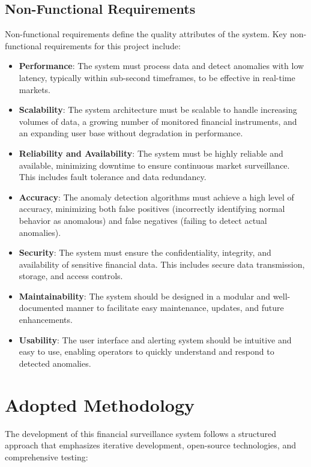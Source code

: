 \subsection{Non-Functional Requirements}
Non-functional requirements define the quality attributes of the system. Key non-functional requirements for this project include:
\begin{itemize}
    \item \textbf{Performance}: The system must process data and detect anomalies with low latency, typically within sub-second timeframes, to be effective in real-time markets.
    \item \textbf{Scalability}: The system architecture must be scalable to handle increasing volumes of data, a growing number of monitored financial instruments, and an expanding user base without degradation in performance.
    \item \textbf{Reliability and Availability}: The system must be highly reliable and available, minimizing downtime to ensure continuous market surveillance. This includes fault tolerance and data redundancy.
    \item \textbf{Accuracy}: The anomaly detection algorithms must achieve a high level of accuracy, minimizing both false positives (incorrectly identifying normal behavior as anomalous) and false negatives (failing to detect actual anomalies).
    \item \textbf{Security}: The system must ensure the confidentiality, integrity, and availability of sensitive financial data. This includes secure data transmission, storage, and access controls.
    \item \textbf{Maintainability}: The system should be designed in a modular and well-documented manner to facilitate easy maintenance, updates, and future enhancements.
    \item \textbf{Usability}: The user interface and alerting system should be intuitive and easy to use, enabling operators to quickly understand and respond to detected anomalies.
\end{itemize}


\section{Adopted Methodology}

The development of this financial surveillance system follows a structured approach that emphasizes iterative development, open-source technologies, and comprehensive testing:

